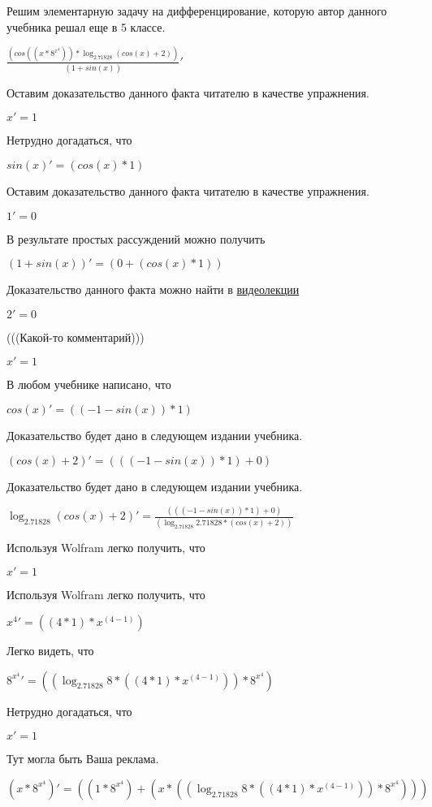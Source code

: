 \documentclass[12pt,a4paper,fleqn]{article}
\theoremstyle{definition}
\begin{document}
Решим элементарную задачу на дифференцирование, которую автор данного учебника решал еще в 5 классе.


$\frac{(cos(( x  * { 8 }^{{ x }^{ 4 }})) * \log_{ 2.71828 }{(cos( x ) +  2 )})}{( 1  + sin( x ))}
'$

Оставим доказательство данного факта читателю в качестве упражнения.

$ x ' =  1 $

Нетрудно догадаться, что

$sin( x )' = (cos( x ) *  1 )$

Оставим доказательство данного факта читателю в качестве упражнения.

$ 1 ' =  0 $

В результате простых рассуждений можно получить

$( 1  + sin( x ))' = ( 0  + (cos( x ) *  1 ))$

Доказательство данного факта можно найти в \href{https://www.youtube.com/watch?v=dQw4w9WgXcQ}{видеолекции}

$ 2 ' =  0 $

(((Какой-то комментарий)))

$ x ' =  1 $

В любом учебнике написано, что

$cos( x )' = (( -1  - sin( x )) *  1 )$

Доказательство будет дано в следующем издании учебника.

$(cos( x ) +  2 )' = ((( -1  - sin( x )) *  1 ) +  0 )$

Доказательство будет дано в следующем издании учебника.

$\log_{ 2.71828 }{(cos( x ) +  2 )}' = \frac{((( -1  - sin( x )) *  1 ) +  0 )}{(\log_{ 2.71828 }{ 2.71828 } * (cos( x ) +  2 ))}
$

Используя Wolfram легко получить, что

$ x ' =  1 $

Используя Wolfram легко получить, что

${ x }^{ 4 }' = (( 4  *  1 ) * { x }^{( 4  -  1 )})$

Легко видеть, что

${ 8 }^{{ x }^{ 4 }}' = ((\log_{ 2.71828 }{ 8 } * (( 4  *  1 ) * { x }^{( 4  -  1 )})) * { 8 }^{{ x }^{ 4 }})$

Нетрудно догадаться, что

$ x ' =  1 $

Тут могла быть Ваша реклама.

$( x  * { 8 }^{{ x }^{ 4 }})' = (( 1  * { 8 }^{{ x }^{ 4 }}) + ( x  * ((\log_{ 2.71828 }{ 8 } * (( 4  *  1 ) * { x }^{( 4  -  1 )})) * { 8 }^{{ x }^{ 4 }})))$
\end{document}
